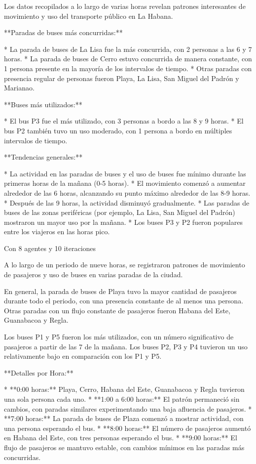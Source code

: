 \documentclass{article}
\begin{document}
Los datos recopilados a lo largo de varias horas revelan patrones interesantes de movimiento y uso del transporte público en La Habana.

**Paradas de buses más concurridas:**

* La parada de buses de La Lisa fue la más concurrida, con 2 personas a las 6 y 7 horas.
* La parada de buses de Cerro estuvo concurrida de manera constante, con 1 persona presente en la mayoría de los intervalos de tiempo.
* Otras paradas con presencia regular de personas fueron Playa, La Lisa, San Miguel del Padrón y Marianao.

**Buses más utilizados:**

* El bus P3 fue el más utilizado, con 3 personas a bordo a las 8 y 9 horas.
* El bus P2 también tuvo un uso moderado, con 1 persona a bordo en múltiples intervalos de tiempo.

**Tendencias generales:**

* La actividad en las paradas de buses y el uso de buses fue mínimo durante las primeras horas de la mañana (0-5 horas).
* El movimiento comenzó a aumentar alrededor de las 6 horas, alcanzando su punto máximo alrededor de las 8-9 horas.
* Después de las 9 horas, la actividad disminuyó gradualmente.
* Las paradas de buses de las zonas periféricas (por ejemplo, La Lisa, San Miguel del Padrón) mostraron un mayor uso por la mañana.
* Los buses P3 y P2 fueron populares entre los viajeros en las horas pico.

 Con 8 agentes y 10 iteraciones

A lo largo de un periodo de nueve horas, se registraron patrones de movimiento de pasajeros y uso de buses en varias paradas de la ciudad.

En general, la parada de buses de Playa tuvo la mayor cantidad de pasajeros durante todo el periodo, con una presencia constante de al menos una persona. Otras paradas con un flujo constante de pasajeros fueron Habana del Este, Guanabacoa y Regla.

Los buses P1 y P5 fueron los más utilizados, con un número significativo de pasajeros a partir de las 7 de la mañana. Los buses P2, P3 y P4 tuvieron un uso relativamente bajo en comparación con los P1 y P5.

**Detalles por Hora:**

* **0:00 horas:** Playa, Cerro, Habana del Este, Guanabacoa y Regla tuvieron una sola persona cada uno.
* **1:00 a 6:00 horas:** El patrón permaneció sin cambios, con paradas similares experimentando una baja afluencia de pasajeros.
* **7:00 horas:** La parada de buses de Plaza comenzó a mostrar actividad, con una persona esperando el bus.
* **8:00 horas:** El número de pasajeros aumentó en Habana del Este, con tres personas esperando el bus.
* **9:00 horas:** El flujo de pasajeros se mantuvo estable, con cambios mínimos en las paradas más concurridas.
\end{document}
